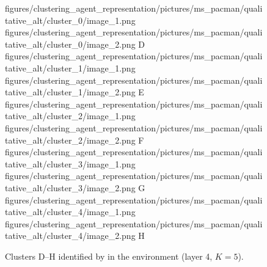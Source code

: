 \begin{figure}[H]
    \qualitativeClusterFigureSetup
    \qualitativeClusterTwo
        {figures/clustering_agent_representation/pictures/ms_pacman/qualitative_alt/cluster_0/image_1.png}
        {figures/clustering_agent_representation/pictures/ms_pacman/qualitative_alt/cluster_0/image_2.png}
        {D}
    \qualitativeClusterTwo
        {figures/clustering_agent_representation/pictures/ms_pacman/qualitative_alt/cluster_1/image_1.png}
        {figures/clustering_agent_representation/pictures/ms_pacman/qualitative_alt/cluster_1/image_2.png}
        {E}
    \qualitativeClusterTwo
        {figures/clustering_agent_representation/pictures/ms_pacman/qualitative_alt/cluster_2/image_1.png}
        {figures/clustering_agent_representation/pictures/ms_pacman/qualitative_alt/cluster_2/image_2.png}
        {F}
    \qualitativeClusterTwo
        {figures/clustering_agent_representation/pictures/ms_pacman/qualitative_alt/cluster_3/image_1.png}
        {figures/clustering_agent_representation/pictures/ms_pacman/qualitative_alt/cluster_3/image_2.png}
        {G}
    \qualitativeClusterTwo
        {figures/clustering_agent_representation/pictures/ms_pacman/qualitative_alt/cluster_4/image_1.png}
        {figures/clustering_agent_representation/pictures/ms_pacman/qualitative_alt/cluster_4/image_2.png}
        {H}
    \caption{Clusters D--H identified by  in the \MsPacManName environment (layer 4, $K=5$).}
    \label{fig:qualitative_ms_pacman_alt}
\end{figure}
